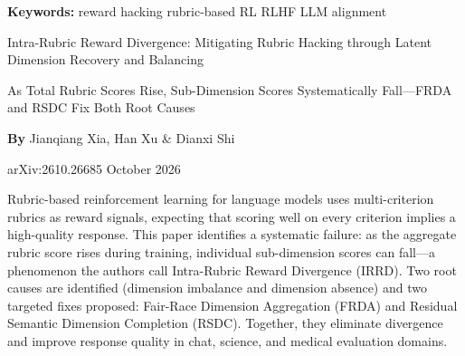 \documentclass[10pt,twocolumn]{article}
\begin{document}
\setlength{\parindent}{0pt}
\setlength{\parskip}{4pt}

{\small\color{keywordgray}\textbf{Keywords:}
  reward hacking \textbullet{}
  rubric-based RL \textbullet{}
  RLHF \textbullet{}
  LLM alignment}\par\vspace{4pt}

{\LARGE\bfseries\raggedright
  Intra-Rubric Reward Divergence: Mitigating Rubric Hacking through
  Latent Dimension Recovery and Balancing}\par\vspace{4pt}

{\large\itshape\raggedright
  As Total Rubric Scores Rise, Sub-Dimension Scores Systematically
  Fall---FRDA and RSDC Fix Both Root Causes}\par\vspace{6pt}

{\small\textbf{By} Jianqiang Xia, Han Xu \& Dianxi Shi}\par\vspace{2pt}

{\small\color{keywordgray}arXiv:2610.26685 \textbullet{}
  October 2026}
\par\vspace{2pt}\noindent{\color{rulered}\rule{\columnwidth}{0.6pt}}\vspace{6pt}

Rubric-based reinforcement learning for language models uses multi-criterion
rubrics as reward signals, expecting that scoring well on every criterion
implies a high-quality response. This paper identifies a systematic failure:
as the aggregate rubric score rises during training, individual sub-dimension
scores can fall---a phenomenon the authors call Intra-Rubric Reward Divergence
(IRRD). Two root causes are identified (dimension imbalance and dimension
absence) and two targeted fixes proposed: Fair-Race Dimension Aggregation
(FRDA) and Residual Semantic Dimension Completion (RSDC). Together, they
eliminate divergence and improve response quality in chat, science, and
medical evaluation domains.
\end{document}
